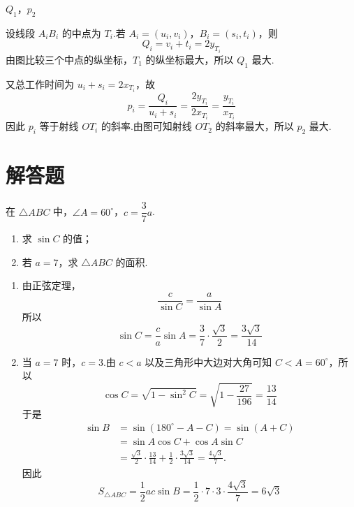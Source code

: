 \begin{answer}
\(Q_1\)，\(p_2\)
\end{answer}

\begin{solution}
设线段 \(A_iB_i\) 的中点为 \(T_i\).若 \(A_i=(u_i,v_i)\)，\(B_i=(s_i,t_i)\)，则
\[
Q_i=v_i+t_i=2y_{T_i}
\]
由图比较三个中点的纵坐标，\(T_1\) 的纵坐标最大，所以 \(Q_1\) 最大.

又总工作时间为 \(u_i+s_i=2x_{T_i}\)，故
\[
p_i=\frac{Q_i}{u_i+s_i}=\frac{2y_{T_i}}{2x_{T_i}}=\frac{y_{T_i}}{x_{T_i}}
\]
因此 \(p_i\) 等于射线 \(OT_i\) 的斜率.由图可知射线 \(OT_2\) 的斜率最大，所以 \(p_2\) 最大.
\end{solution}

\section{解答题}

\begin{problem}
在 \(\triangle ABC\) 中，\(\angle A=60^\circ\)，\(c=\dfrac37a\).

\begin{enumerate}
\item 求 \(\sin C\) 的值；
\item 若 \(a=7\)，求 \(\triangle ABC\) 的面积.
\end{enumerate}
\end{problem}

\begin{solution}
\begin{enumerate}
\item 由正弦定理，
\[
\frac{c}{\sin C}=\frac{a}{\sin A}
\]
所以
\[
\sin C=\frac{c}{a}\sin A=\frac37\cdot\frac{\sqrt3}{2}=\frac{3\sqrt3}{14}
\]

\item 当 \(a=7\) 时，\(c=3\).由 \(c<a\) 以及三角形中大边对大角可知 \(C<A=60^\circ\)，所以
\[
\cos C=\sqrt{1-\sin^2C}=\sqrt{1-\frac{27}{196}}=\frac{13}{14}
\]
于是
\[
\begin{aligned}
\sin B&=\sin(180^\circ-A-C)=\sin(A+C)\\
&=\sin A\cos C+\cos A\sin C\\
&=\frac{\sqrt3}{2}\cdot\frac{13}{14}+\frac12\cdot\frac{3\sqrt3}{14}
=\frac{4\sqrt3}{7}.
\end{aligned}
\]
因此
\[
S_{\triangle ABC}=\frac12ac\sin B
=\frac12\cdot7\cdot3\cdot\frac{4\sqrt3}{7}=6\sqrt3
\]
\end{enumerate}
\end{solution}

